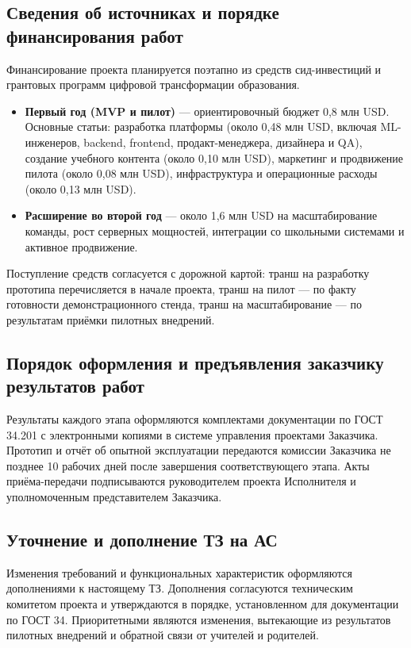 \documentclass[14pt,a4paper]{extarticle}
\begin{document}
\subsection{Сведения об источниках и порядке финансирования работ}
Финансирование проекта планируется поэтапно из средств сид-инвестиций и грантовых программ цифровой трансформации образования.
\begin{itemize}
  \item \textbf{Первый год (MVP и пилот)} — ориентировочный бюджет 0,8 млн USD. Основные статьи: разработка платформы (около 0,48 млн USD, включая ML-инженеров, backend, frontend, продакт-менеджера, дизайнера и QA), создание учебного контента (около 0,10 млн USD), маркетинг и продвижение пилота (около 0,08 млн USD), инфраструктура и операционные расходы (около 0,13 млн USD).
  \item \textbf{Расширение во второй год} — около 1,6 млн USD на масштабирование команды, рост серверных мощностей, интеграции со школьными системами и активное продвижение.
\end{itemize}
Поступление средств согласуется с дорожной картой: транш на разработку прототипа перечисляется в начале проекта, транш на пилот — по факту готовности демонстрационного стенда, транш на масштабирование — по результатам приёмки пилотных внедрений.

\subsection{Порядок оформления и предъявления заказчику результатов работ}
Результаты каждого этапа оформляются комплектами документации по ГОСТ 34.201 с электронными копиями в системе управления проектами Заказчика. Прототип и отчёт об опытной эксплуатации передаются комиссии Заказчика не позднее 10 рабочих дней после завершения соответствующего этапа. Акты приёма-передачи подписываются руководителем проекта Исполнителя и уполномоченным представителем Заказчика.

\subsection{Уточнение и дополнение ТЗ на АС}
Изменения требований и функциональных характеристик оформляются дополнениями к настоящему ТЗ. Дополнения согласуются техническим комитетом проекта и утверждаются в порядке, установленном для документации по ГОСТ 34. Приоритетными являются изменения, вытекающие из результатов пилотных внедрений и обратной связи от учителей и родителей.
\end{document}
